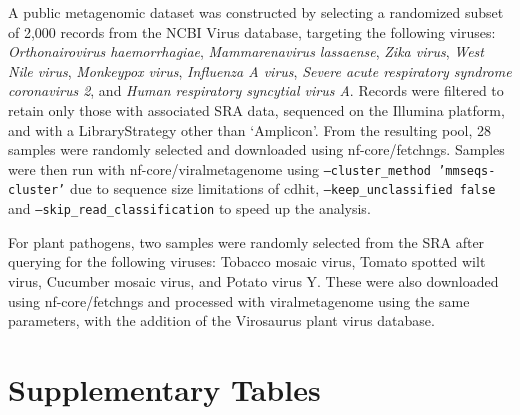 A public metagenomic dataset was constructed by selecting a randomized subset of 2,000 records from the NCBI Virus database, targeting the following viruses: \textit{Orthonairovirus haemorrhagiae}, \textit{Mammarenavirus lassaense}, \textit{Zika virus}, \textit{West Nile virus}, \textit{Monkeypox virus}, \textit{Influenza A virus}, \textit{Severe acute respiratory syndrome coronavirus 2}, and \textit{Human respiratory syncytial virus A}. Records were filtered to retain only those with associated SRA data, sequenced on the Illumina platform, and with a LibraryStrategy other than ‘Amplicon’. From the resulting pool, 28 samples were randomly selected and downloaded using nf-core/fetchngs. Samples were then run with nf-core/viralmetagenome using \texttt{--cluster\_method 'mmseqs-cluster'} due to sequence size limitations of cdhit, \texttt{--keep\_unclassified false} and \texttt{--skip\_read\_classification} to speed up the analysis.

For plant pathogens, two samples were randomly selected from the SRA after querying for the following viruses: Tobacco mosaic virus, Tomato spotted wilt virus, Cucumber mosaic virus, and Potato virus Y. These were also downloaded using nf-core/fetchngs and processed with viralmetagenome using the same parameters, with the addition of the Virosaurus plant virus database.

\newpage

\section*{Supplementary Tables}

